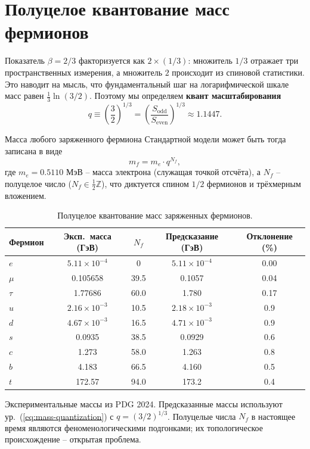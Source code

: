 \documentclass[11pt,a4paper]{article}
\begin{document}
	\section{Полуцелое квантование масс фермионов}
	
	Показатель \(\beta = 2/3\) факторизуется как \(2 \times (1/3)\): множитель \(1/3\) отражает три пространственных измерения, а множитель \(2\) происходит из спиновой статистики.  Это наводит на мысль, что фундаментальный шаг на логарифмической шкале масс равен \(\frac{1}{3}\ln(3/2)\).  Поэтому мы определяем \textbf{квант масштабирования}
	\begin{equation}
		q \equiv \left(\frac{3}{2}\right)^{1/3} = \left(\frac{S_{\mathrm{odd}}}{S_{\mathrm{even}}}\right)^{1/3} \approx 1.1447.
	\end{equation}
	
	Масса любого заряженного фермиона Стандартной модели может быть тогда записана в виде
	\begin{equation}
		\boxed{m_f = m_e \cdot q^{N_f}},
		\label{eq:mass-quantization}
	\end{equation}
	где \(m_e = 0.5110\) МэВ – масса электрона (служащая точкой отсчёта), а \(N_f\) – полуцелое число (\(N_f \in \frac{1}{2}\mathbb{Z}\)), что диктуется спином \(1/2\) фермионов и трёхмерным вложением.
	
	\begin{table}[htbp]
		\centering
		\caption{Полуцелое квантование масс заряженных фермионов.}
		\label{tab:fermions}
		\begin{tabular}{l c c c c}
			\toprule
			Фермион & Эксп.\ масса (ГэВ) & \(N_f\) & Предсказание (ГэВ) & Отклонение (\%) \\
			\midrule
			\(e\)   & \(5.11\times10^{-4}\) & 0      & \(5.11\times10^{-4}\) & 0.00 \\
			\(\mu\)  & 0.105658             & 39.5   & 0.1057               & 0.04 \\
			\(\tau\) & 1.77686              & 60.0   & 1.780                & 0.17 \\
			\(u\)   & \(2.16\times10^{-3}\) & 10.5   & \(2.18\times10^{-3}\) & 0.9 \\
			\(d\)   & \(4.67\times10^{-3}\) & 16.5   & \(4.71\times10^{-3}\) & 0.9 \\
			\(s\)   & 0.0935               & 38.5   & 0.0929               & 0.6 \\
			\(c\)   & 1.273                & 58.0   & 1.263                & 0.8 \\
			\(b\)   & 4.183                & 66.5   & 4.160                & 0.5 \\
			\(t\)   & 172.57               & 94.0   & 173.2                & 0.4 \\
			\bottomrule
		\end{tabular}
		\par\smallskip
		\footnotesize
		Экспериментальные массы из PDG 2024.  Предсказанные массы используют ур.~(\ref{eq:mass-quantization}) с \(q = (3/2)^{1/3}\).  Полуцелые числа \(N_f\) в настоящее время являются феноменологическими подгонками; их топологическое происхождение – открытая проблема.
	\end{table}
	
\end{document}
